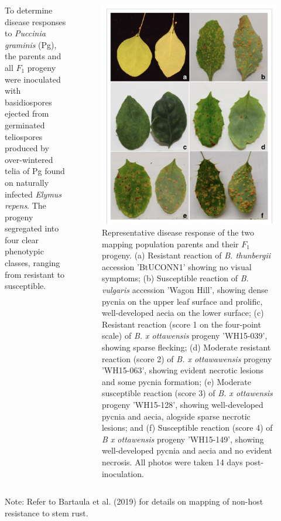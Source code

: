 \documentclass[11pt,dvipsnames,ignorenonframetext,aspectratio=169]{beamer}
\begin{document}
\begin{frame}{}
\protect\hypertarget{section-3}{}
\begin{columns}[T, onlytextwidth]

\footnotesize

To determine disease responses to \textit{Puccinia graminis} (Pg), the parents and all $F_1$ progeny were inoculated with basidiospores ejected from germinated teliospores produced by over-wintered telia of Pg found on naturally infected \textit{Elymus repens}. The progeny segregated into four clear phenotypic classes, ranging from resistant to susceptible.


\begin{figure}
\includegraphics[width=0.28\linewidth]{../images/non-host-resistance-stem-rust} \caption{Representative disease response of the two mapping population parents and their $F_1$ progeny. (a) Resistant reaction of \textit{B. thunbergii} accession 'BtUCONN1' showing no visual symptoms; (b) Susceptible reaction of \textit{B. vulgaris} accession 'Wagon Hill', showing dense pycnia on the upper leaf surface and prolific, well-developed aecia on the lower surface; (c) Resistant reaction (score 1 on the four-point scale) of \textit{B. x ottawensis} progeny 'WH15-039', showing sparse flecking; (d) Moderate resistant reaction (score 2) of \textit{B. x ottawawensis} progeny 'WH15-063', showing evident necrotic lesions and some pycnia formation; (e) Moderate susceptible reaction (score 3) of \textit{B. x ottawensis} progeny 'WH15-128', showing well-developed pycnia and aecia, alogside sparse necrotic lesions; and (f) Susceptible reaction (score 4) of \textit{B x ottawensis} progeny 'WH15-149', showing well-developed pycnia and aecia and no evident necrosis. All photos were taken 14 days post-inoculation.}\label{fig:non-host-resistance}
\end{figure}

\end{columns}

\footnotesize Note: Refer to Bartaula et al. (2019) for details on
mapping of non-host resistance to stem rust.
\end{frame}
\end{document}
